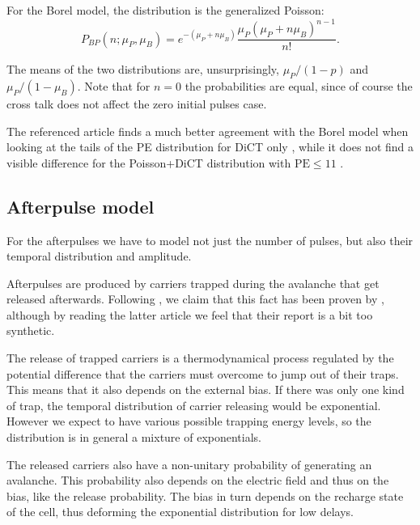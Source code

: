 For the Borel model, the distribution is the generalized Poisson:
%
\begin{equation}
    P_{BP}(n;\mu_P,\mu_B)
    = e^{-(\mu_P + n\mu_B)} \frac {\mu_P(\mu_P + n\mu_B)^{n-1}} {n!}.
    \label{eq:genpoisson}
\end{equation}

The means of the two distributions are, unsurprisingly, $\mu_P/(1-p)$ and
$\mu_P/(1-\mu_B)$. Note that for $n = 0$ the probabilities are equal, since
of course the cross talk does not affect the zero initial pulses case.

The referenced article finds a much better agreement with the Borel model when
looking at the tails of the PE distribution for DiCT only
\cite[p.~3~fig.~1]{vinogradov2012}, while it does not find a visible difference
for the Poisson+DiCT distribution with $\text{PE} \le 11$
\cite[p.~4~fig.~2]{vinogradov2012}.

\subsection{Afterpulse model}

For the afterpulses we have to model not just the number of pulses, but also
their temporal distribution and amplitude.

Afterpulses are produced by carriers trapped during the avalanche that get
released afterwards. Following \cite[1]{nagy2014}, we claim that this fact has
been proven by \cite{cova1991}, although by reading the latter article we feel
that their report is a bit too synthetic.

The release of trapped carriers is a thermodynamical process regulated by the
potential difference that the carriers must overcome to jump out of their
traps. This means that it also depends on the external bias. If there was only
one kind of trap, the temporal distribution of carrier releasing would be
exponential. However we expect to have various possible trapping energy levels,
so the distribution is in general a mixture of exponentials.

The released carriers also have a non-unitary probability of generating an
avalanche. This probability also depends on the electric field and thus on the
bias, like the release probability. The bias in turn depends on the recharge
state of the cell, thus deforming the exponential distribution for low delays.

